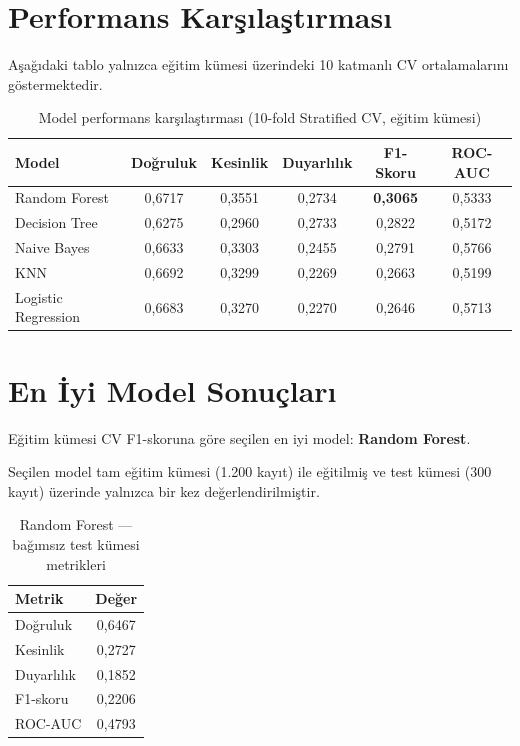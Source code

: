 \documentclass[12pt,a4paper]{report}
\begin{document}
\chapter{Performans Karşılaştırması}
Aşağıdaki tablo yalnızca eğitim kümesi üzerindeki 10 katmanlı CV ortalamalarını göstermektedir.

\begin{table}[H]
    \centering
    \caption{Model performans karşılaştırması (10-fold Stratified CV, eğitim kümesi)}
    \begin{tabular}{lccccc}
        \toprule
        Model & Doğruluk & Kesinlik & Duyarlılık & F1-Skoru & ROC-AUC \\
        \midrule
        Random Forest       & 0,6717 & 0,3551 & 0,2734 & \textbf{0,3065} & 0,5333 \\
        Decision Tree       & 0,6275 & 0,2960 & 0,2733 & 0,2822 & 0,5172 \\
        Naive Bayes         & 0,6633 & 0,3303 & 0,2455 & 0,2791 & 0,5766 \\
        KNN                 & 0,6692 & 0,3299 & 0,2269 & 0,2663 & 0,5199 \\
        Logistic Regression & 0,6683 & 0,3270 & 0,2270 & 0,2646 & 0,5713 \\
        \bottomrule
    \end{tabular}
\end{table}

\chapter{En İyi Model Sonuçları}
Eğitim kümesi CV F1-skoruna göre seçilen en iyi model: \textbf{Random Forest}.

Seçilen model tam eğitim kümesi (1.200 kayıt) ile eğitilmiş ve test kümesi (300 kayıt) üzerinde yalnızca bir kez değerlendirilmiştir.

\begin{table}[H]
    \centering
    \caption{Random Forest --- bağımsız test kümesi metrikleri}
    \begin{tabular}{lc}
        \toprule
        Metrik & Değer \\
        \midrule
        Doğruluk  & 0,6467 \\
        Kesinlik  & 0,2727 \\
        Duyarlılık & 0,1852 \\
        F1-skoru  & 0,2206 \\
        ROC-AUC   & 0,4793 \\
        \bottomrule
    \end{tabular}
\end{table}
\end{document}
